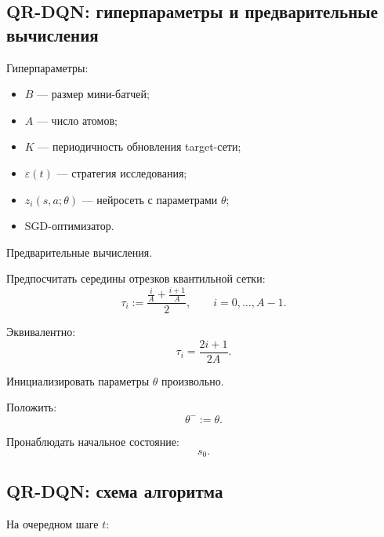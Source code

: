 \documentclass[12pt,a4paper]{article}
\begin{document}
\subsection{QR-DQN: гиперпараметры и предварительные вычисления}

Гиперпараметры:
\begin{itemize}
    \item $B$ --- размер мини-батчей;
    \item $A$ --- число атомов;
    \item $K$ --- периодичность обновления target-сети;
    \item $\varepsilon(t)$ --- стратегия исследования;
    \item $z_i(s,a;\theta)$ --- нейросеть с параметрами $\theta$;
    \item SGD-оптимизатор.
\end{itemize}

Предварительные вычисления.

Предпосчитать середины отрезков квантильной сетки:
\[
\tau_i
:=
\frac{\frac{i}{A}+\frac{i+1}{A}}{2},
\qquad
i=0,\ldots,A-1.
\]

Эквивалентно:
\[
\tau_i
=
\frac{2i+1}{2A}.
\]

Инициализировать параметры $\theta$ произвольно.

Положить:
\[
\theta^- := \theta.
\]

Пронаблюдать начальное состояние:
\[
s_0.
\]

\subsection{QR-DQN: схема алгоритма}

На очередном шаге $t$:
\end{document}
